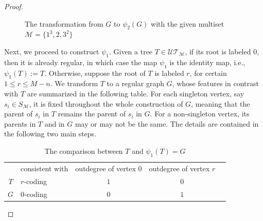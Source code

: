 \documentclass[11pt,reqno]{amsart}
\numberwithin{equation}{section}
\theoremstyle{plain}
\theoremstyle{definition}
\newcommand{\M}{\mathcal{M}}
\newcommand{\UT}{\mathcal{UT}}
\begin{document}
\begin{proof}
\begin{figure}[htb]
\caption{The transformation from $G$ to $\psi_2(G)$ with the given multiset $\M=\{1^3,2,3^2\}$}
\label{fig:psi2}
\end{figure}

Next, we proceed to construct $\psi_1$. Given a tree $T\in\UT_{\M}$, if its root is labeled $0$, then it is already regular, in which case the map $\psi_1$ is the identity map, i.e., $\psi_1(T):=T$. Otherwise, suppose the root of $T$ is labeled $r$, for certain $1\le r\le M-n$. We transform $T$ to a regular graph $G$, whose features in contrast with $T$ are summarized in the following table. For each singleton vertex, say $s_i\in S_{\M}$, it is fixed throughout the whole construction of $G$, meaning that the parent of $s_i$ in $T$ remains the parent of $s_i$ in $G$. For a non-singleton vertex, its parents in $T$ and in $G$ may or may not be the same. The details are contained in the following two main steps. 
\begin{table}[htb]
\centering
\begin{tabular}{cVc|c|c}
 & consistent with & outdegree of vertex $0$ & outdegree of vertex $r$\\
\Xhline{2pt}
$T$ & $r$-coding & $1$ & $0$\\
$G$ & $0$-coding & $0$ & $1$
\end{tabular}
\vspace{3mm}
\caption{The comparison between $T$ and $\psi_1(T)=G$}
\label{T and G}
\end{table}


\end{proof}
\end{document}
